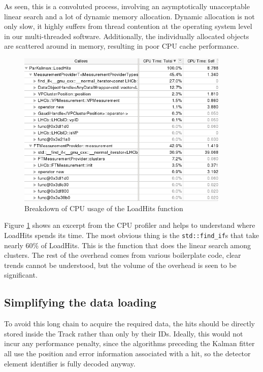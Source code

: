 \documentclass[12pt]{article}
\newcommand{\code}[1]{\texttt{#1}}
\begin{document}
As seen, this is a convoluted process, involving an asymptotically unacceptable linear search and a lot of dynamic memory allocation. Dynamic allocation is not only slow, it highly suffers from thread contention at the operating system level in our multi-threaded software. Additionally, the individually allocated objects are scattered around in memory, resulting in poor CPU cache performance.

\begin{figure}[H]
	\begin{center}
		\includegraphics[width=0.9\textwidth]{kalmanfit_loadhits_breakdown}
	\end{center}
	\caption{Breakdown of CPU usage of the LoadHits function}
	\label{fig_kalmanfit_loadhits_breakdown}
\end{figure}

Figure \ref{fig_kalmanfit_loadhits_breakdown} shows an excerpt from the CPU profiler and helps to understand where LoadHits spends its time. The most obvious thing is the \code{std::find\_if}s that take nearly 60\% of LoadHits. This is the function that does the linear search among clusters. The rest of the overhead comes from various boilerplate code, clear trends cannot be understood, but the volume of the overhead is seen to be significant.


\subsection{Simplifying the data loading}

To avoid this long chain to acquire the required data, the hits should be directly stored inside the Track rather than only by their IDs. Ideally, this would not incur any performance penalty, since the algorithms preceding the Kalman fitter all use the position and error information associated with a hit, so the detector element identifier is fully decoded anyway.
\end{document}

